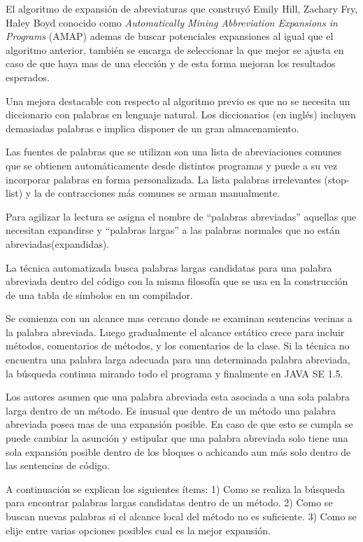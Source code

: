 \documentclass[12pt]{report}
\begin{document}
El algoritmo de expansión de abreviaturas que construyó Emily Hill, Zachary Fry, Haley Boyd\cite{EZH08} conocido como \textit{Automatically Mining Abbreviation Expansions in Programs} (AMAP) ademas de buscar potenciales expansiones al igual que el algoritmo anterior, también se encarga de seleccionar la que mejor se ajusta en caso de que haya mas de una elección y de esta forma mejoran los resultados esperados.

Una mejora destacable con respecto al algoritmo previo es que no se necesita un diccionario con palabras en lenguaje natural. Los diccionarios (en inglés) incluyen demasiadas palabras e implica disponer de un gran almacenamiento. 

Las fuentes de palabras que se utilizan son una lista de abreviaciones comunes que se obtienen automáticamente desde distintos programas y puede a su vez incorporar palabras en forma personalizada. La lista palabras irrelevantes (stop-list) y la de contracciones más comunes se arman manualmente.

Para agilizar la lectura se asigna el nombre de “palabras abreviadas” aquellas que necesitan expandirse y “palabras largas” a las palabras normales que no están abreviadas(expandidas).

La técnica automatizada busca palabras largas candidatas para una palabra abreviada dentro del código con la misma filosofía que se usa en la construcción de una tabla de símbolos en un compilador.

Se comienza con un alcance mas cercano donde se examinan sentencias vecinas a la palabra abreviada. Luego gradualmente el alcance estático crece para incluir métodos, comentarios de métodos, y los comentarios de la clase. Si la técnica no encuentra una palabra larga adecuada para una determinada palabra abreviada, la búsqueda continua mirando todo el programa y finalmente en JAVA SE 1.5. 

Los autores asumen que una palabra abreviada esta asociada a una sola palabra larga dentro de un método. Es inusual que dentro de un método una palabra abreviada posea mas de una expansión posible. En caso de que esto se cumpla se puede cambiar la asunción y estipular que una palabra abreviada solo tiene una sola expansión posible dentro de los bloques o achicando aun más solo dentro de las sentencias de código.


A continuación se explican los siguientes ítems: 1) Como se realiza la búsqueda para encontrar palabras largas candidatas dentro de un método. 2) Como se buscan nuevas palabras si el alcance local del método no es suficiente. 3) Como se elije entre varias opciones posibles cual es la mejor expansión.
\end{document}
